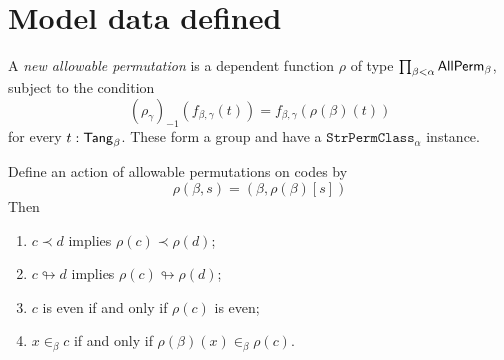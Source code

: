 \section{Model data defined}
\begin{definition}
  \label{def:NewAllPerm}
  A \emph{new allowable permutation} is a dependent function \( \rho \) of type \( \prod_{\beta < \alpha} \mathsf{AllPerm}_\beta \), subject to the condition
  \[ (\rho_\gamma)_{-1}(f_{\beta,\gamma}(t)) = f_{\beta,\gamma}(\rho(\beta)(t)) \]
  for every \( t : \mathsf{Tang}_\beta \).
  These form a group and have a \( \texttt{StrPermClass}_\alpha \) instance.
\end{definition}
\begin{proposition}
  \label{prop:AllPerm.smul_cloud_smul}
  Define an action of allowable permutations on codes by
  \[ \rho(\beta, s) = (\beta, \rho(\beta)[s]) \]
  Then
  \begin{enumerate}
    \item \( c \prec d \) implies \( \rho(c) \prec \rho(d) \);
    \item \( c \looparrowright d \) implies \( \rho(c) \looparrowright \rho(d) \);
    \item \( c \) is even if and only if \( \rho(c) \) is even;
    \item \( x \in_\beta c \) if and only if \( \rho(\beta)(x) \in_\beta \rho(c) \).
  \end{enumerate}
\end{proposition}
